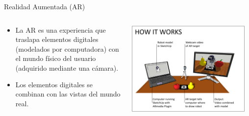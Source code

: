 
\begin{frame}{Realidad Aumentada (AR) \footnotemark}
\begin{columns}
\begin{column}{0.49\textwidth}
\begin{itemize}
\item La AR es una experiencia que traslapa elementos digitales (modelados por computadora) con el mundo físico del usuario (adquirido mediante una cámara). 
\item Los elementos digitales se combinan con las vistas del mundo real.
\end{itemize}
\end{column}
\begin{column}{0.49\textwidth}
\begin{center}
\includegraphics[width=0.95\textwidth]{Figs/AR_HowItWorks}
\end{center}
\end{column}
\end{columns}
\end{frame}

